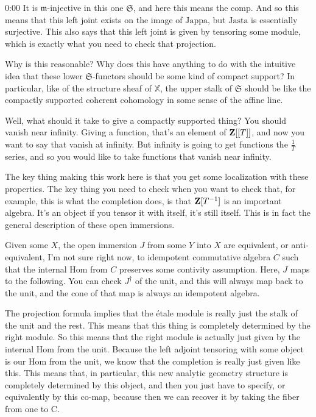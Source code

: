 \begin{unfinished}{0:00}
It is $\mathfrak{m}$-injective in this one $\mathfrak{S}$, and here this means the comp. And so this means that this left joint exists on the image of $\text{Jappa}$, but $\text{Jasta}$ is essentially surjective. This also says that this left joint is given by tensoring some module, which is exactly what you need to check that projection.

Why is this reasonable? Why does this have anything to do with the intuitive idea that these lower $\mathfrak{S}$-functors should be some kind of compact support? In particular, like of the structure sheaf of $\mathbb{X}$, the upper stalk of $\mathfrak{S}$ should be like the compactly supported coherent cohomology in some sense of the affine line. 

Well, what should it take to give a compactly supported thing? You should vanish near infinity. Giving a function, that's an element of $\mathbf Z[[T]]$, and now you want to say that vanish at infinity. But infinity is going to get functions the $\frac{1}{T}$ series, and so you would like to take functions that vanish near infinity. 

The key thing making this work here is that you get some localization with these properties. The key thing you need to check when you want to check that, for example, this is what the completion does, is that $\mathbf Z[T^{-1}]$ is an important algebra. It's an object if you tensor it with itself, it's still itself. This is in fact the general description of these open immersions.

Given some $X$, the open immersion $J$ from some $Y$ into $X$ are equivalent, or anti-equivalent, I'm not sure right now, to idempotent commutative algebra $C$ such that the internal Hom from $C$ preserves some contivity assumption. Here, $J$ maps to the following. You can check $J^\dagger$ of the unit, and this will always map back to the unit, and the cone of that map is always an idempotent algebra.

The projection formula implies that the étale module is really just the stalk of the unit and the rest. This means that this thing is completely determined by the right module. So this means that the right module is actually just given by the internal Hom from the unit. Because the left adjoint tensoring with some object is our Hom from the unit, we know that the completion is really just given like this. This means that, in particular, this new analytic geometry structure is completely determined by this object, and then you just have to specify, or equivalently by this co-map, because then we can recover it by taking the fiber from one to C.


\end{unfinished}
